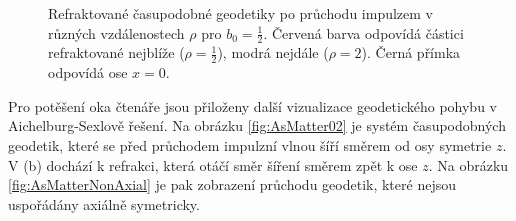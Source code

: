 \begin{figure}[!ht]
    \centering
    \caption{Refraktované časupodobné geodetiky po průchodu impulzem v různých vzdálenostech $\rho$ pro $b_0 = \frac{1}{2}$.
    Červená barva odpovídá částici refraktované nejblíže ($\rho=\frac{1}{2}$), modrá nejdále ($\rho = 2$). Černá přímka odpovídá
    ose $x=0$.}
    \label{fig:AS_zavislost_na_rho}
\end{figure}


Pro potěšení oka čtenáře jsou přiloženy další vizualizace geodetického pohybu v Aichelburg-Sexlově řešení. Na obrázku \ref{fig:AsMatter02} je systém časupodobných geodetik, které se před
průchodem impulzní vlnou šíří směrem od osy symetrie $z$. V (b) dochází k refrakci, která otáčí směr šíření směrem zpět k ose $z$.
Na obrázku \ref{fig:AsMatterNonAxial} je pak zobrazení průchodu geodetik, které nejsou uspořádány axiálně symetricky.

